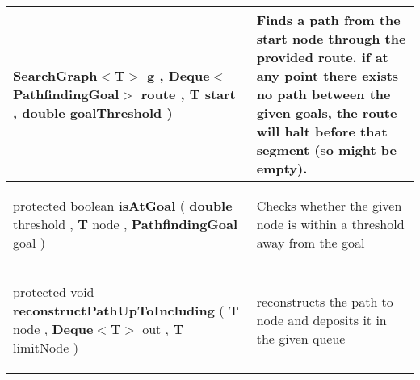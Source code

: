{\begin{tabularx}{\linewidth}{m{}|m{}}
\begin{raggedleft}
\hspace*{ 5pt} \textbf{SearchGraph$<$T$>$} g , \newline
 \hspace*{ 5pt} \textbf{Deque$<$PathfindingGoal$>$} route , \newline
 \hspace*{ 5pt} \textbf{T} start , \newline
 \hspace*{ 5pt} \textbf{double} goalThreshold  )
\end{raggedleft} &
 Finds a path from the start node through the provided route. if at any point there exists no path between the given goals, the route will halt before that segment (so might be empty).\\ \hline 
\begin{raggedleft}protected boolean \textbf{isAtGoal }(\newline \hfill 
\hspace*{ 5pt} \textbf{double} threshold , \newline
 \hspace*{ 5pt} \textbf{T} node , \newline
 \hspace*{ 5pt} \textbf{PathfindingGoal} goal  )
\end{raggedleft} &
 Checks whether the given node is within a threshold away from the goal\\ \hline 
\begin{raggedleft}protected void \textbf{reconstructPathUpToIncluding }(\newline \hfill 
\hspace*{ 5pt} \textbf{T} node , \newline
 \hspace*{ 5pt} \textbf{Deque$<$T$>$} out , \newline
 \hspace*{ 5pt} \textbf{T} limitNode  )
\end{raggedleft} &
 reconstructs the path to node and deposits it in the given queue\\\end{tabularx}
}
